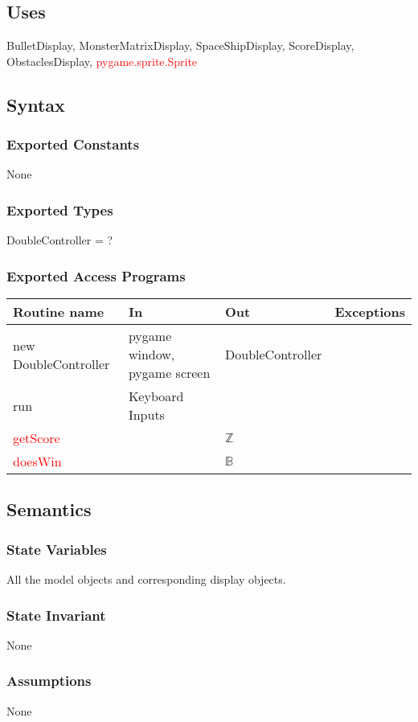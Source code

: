 \documentclass[12pt]{article}
\begin{document}
\subsection*{Uses}
BulletDisplay, MonsterMatrixDisplay, SpaceShipDisplay, ScoreDisplay,
ObstaclesDisplay, \textcolor{red}{pygame.sprite.Sprite}

\subsection*{Syntax}
\subsubsection*{Exported Constants}
None
\subsubsection*{Exported Types}
DoubleController = ?
\subsubsection*{Exported Access Programs}
\begin{tabular}{| l | l | l | p{5cm} |}
\hline
\textbf{Routine name} & \textbf{In} & \textbf{Out} & \textbf{Exceptions}\\
\hline
new DoubleController & pygame window, pygame screen  & DoubleController & \\
\hline
run & Keyboard Inputs &  & \\
\hline
\textcolor{red}{getScore} &&$\mathbb{Z}$&\\
\hline
\textcolor{red}{doesWin} &&$\mathbb{B}$&\\
\hline
\end{tabular}

\subsection*{Semantics}
\subsubsection*{State Variables}
All the model objects and corresponding display objects.
\subsubsection*{State Invariant}
None
\subsubsection*{Assumptions}
None
\end{document}
